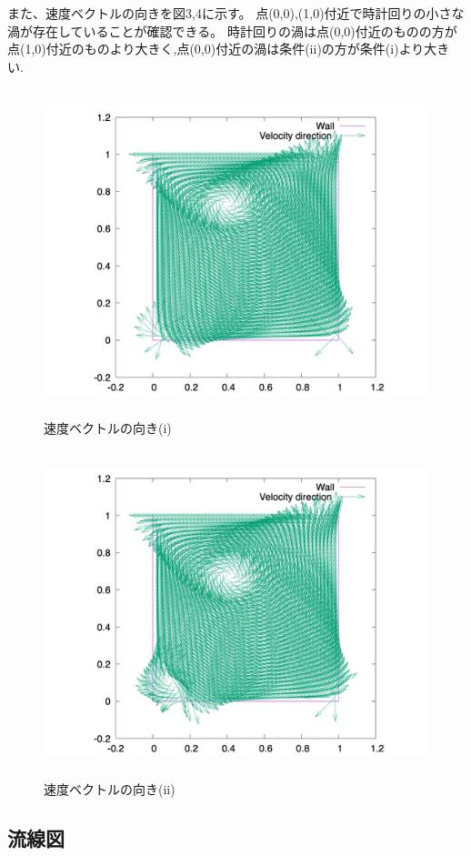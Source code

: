 \documentclass[upLaTeX,a4paper]{jsarticle}
\begin{document}
また、速度ベクトルの向きを図3,4に示す。
点(0,0),(1,0)付近で時計回りの小さな渦が存在していることが確認できる。
時計回りの渦は点(0,0)付近のものの方が点(1,0)付近のものより大きく,点(0,0)付近の渦は条件(ii)の方が条件(i)より大きい.

\begin{figure}[H]
  \centering
  \includegraphics[height=9.5cm]{outputs/img/velocity_abs_re50.png}
  \caption{速度ベクトルの向き(i)}
\end{figure}
\begin{figure}[H]
  \centering
  \includegraphics[height=9.5cm]{outputs/img/velocity_abs_re200.png}
  \caption{速度ベクトルの向き(ii)}
\end{figure}


\subsection{流線図}
\end{document}
